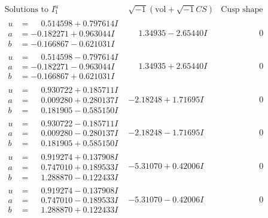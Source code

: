 \documentclass[1p]{elsarticle_modified}
\theoremstyle{definition}
\newcommand{\I}{\sqrt{-1}}
\begin{document}
$$\begin{array}{c|c|c}  
\text{Solutions to }I^u_{1}& \I (\text{vol} + \sqrt{-1}CS) & \text{Cusp shape}\\
 \hline 
\begin{aligned}
u &= \phantom{-}0.514598 + 0.797614 I \\
a &= -0.182271 + 0.963044 I \\
b &= -0.166867 - 0.621031 I\end{aligned}
 & \phantom{-}1.34935 - 2.65440 I & \phantom{-0.000000 } 0 \\ \hline\begin{aligned}
u &= \phantom{-}0.514598 - 0.797614 I \\
a &= -0.182271 - 0.963044 I \\
b &= -0.166867 + 0.621031 I\end{aligned}
 & \phantom{-}1.34935 + 2.65440 I & \phantom{-0.000000 } 0 \\ \hline\begin{aligned}
u &= \phantom{-}0.930722 + 0.185711 I \\
a &= \phantom{-}0.009280 + 0.280137 I \\
b &= \phantom{-}0.181905 - 0.585150 I\end{aligned}
 & -2.18248 + 1.71695 I & \phantom{-0.000000 } 0 \\ \hline\begin{aligned}
u &= \phantom{-}0.930722 - 0.185711 I \\
a &= \phantom{-}0.009280 - 0.280137 I \\
b &= \phantom{-}0.181905 + 0.585150 I\end{aligned}
 & -2.18248 - 1.71695 I & \phantom{-0.000000 } 0 \\ \hline\begin{aligned}
u &= \phantom{-}0.919274 + 0.137908 I \\
a &= \phantom{-}0.747010 + 0.189533 I \\
b &= \phantom{-}1.288870 - 0.122433 I\end{aligned}
 & -5.31070 + 0.42006 I & \phantom{-0.000000 } 0 \\ \hline\begin{aligned}
u &= \phantom{-}0.919274 - 0.137908 I \\
a &= \phantom{-}0.747010 - 0.189533 I \\
b &= \phantom{-}1.288870 + 0.122433 I\end{aligned}
 & -5.31070 - 0.42006 I & \phantom{-0.000000 } 0 \\ \hline\begin{aligned}

\end{aligned}
\end{array}$$
\end{document}
